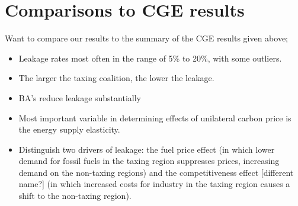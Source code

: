 \documentclass[notitlepage,12pt]{article}
\begin{document}
\section{Comparisons to CGE results}

Want to compare our results to the summary of the CGE results given above;

\begin{itemize}
\item Leakage rates most often in the range of 5\% to 20\%, with some
outliers.

\item The larger the taxing coalition, the lower the leakage.

\item BA's reduce leakage substantially

\item Most important variable in determining effects of unilateral carbon
price is the energy supply elasticity.

\item Distinguish two drivers of leakage: the fuel price effect (in which
lower demand for fossil fuels in the taxing region suppresses prices,
increasing demand on the non-taxing regions) and the competitiveness effect
[different name?] (in which increased costs for industry in the taxing
region causes a shift to the non-taxing region).
\end{itemize}
\end{document}
